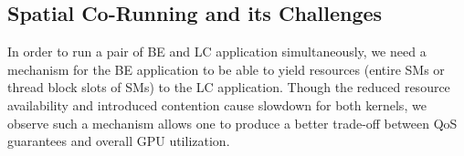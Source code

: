 	\subsection{Spatial Co-Running and its Challenges}
In order to run a pair of BE and LC application simultaneously, we need a mechanism for the BE application to be able to yield resources (entire SMs or thread block slots of SMs) to the LC application. Though the reduced resource availability and introduced contention cause slowdown for both kernels, we observe such a mechanism allows one to produce a better trade-off between QoS guarantees and overall GPU utilization. 
		
